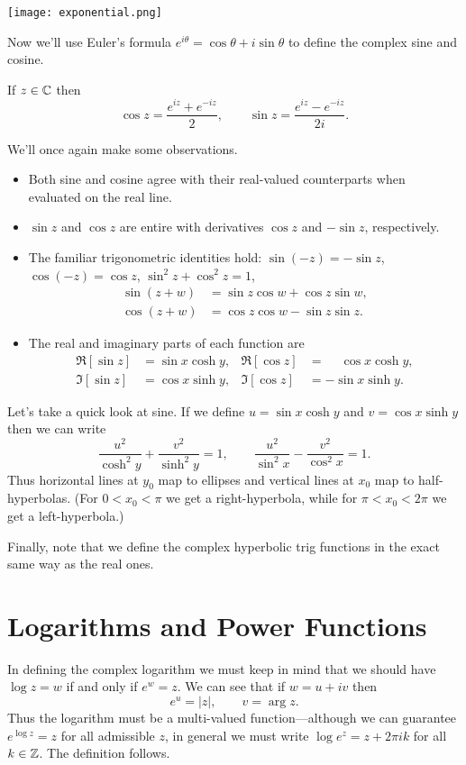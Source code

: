 \documentclass[../m136main.tex]{subfiles}
\begin{document}
\begin{center}
    \texttt{[image: exponential.png]}
\end{center}

Now we'll use Euler's formula $e^{i\theta} = \cos \theta + i \sin \theta$ to define the complex sine and cosine.

\begin{definition}
    If $z \in \mathbb{C}$ then
    \[ \cos z = \frac{e^{iz} + e^{-iz}}{2}, \qquad \sin z = \frac{e^{iz} - e^{-iz}}{2i}. \]
\end{definition}

We'll once again make some observations.
\begin{itemize}[topsep=0pt]
    \item Both sine and cosine agree with their real-valued counterparts when evaluated on the real line.
    \item $\sin z$ and $\cos z$ are entire with derivatives $\cos z$ and $-\sin z$, respectively.
    \item The familiar trigonometric identities hold: $\sin(-z) = -\sin z$, $\cos(-z) = \cos z$, $\sin^2 z + \cos^2 z = 1$,
    \begin{align*}
        \sin(z + w) &= \sin z \cos w + \cos z \sin w, \\
        \cos(z + w) &= \cos z \cos w - \sin z \sin z.
    \end{align*}
    \item The real and imaginary parts of each function are
    \begin{align*}
        \Re [\sin z] &= \sin x \cosh y, & \Re [\cos z] &= \phantom{-}\cos x \cosh y, \\
        \Im [\sin z] &= \cos x \sinh y, & \Im [\cos z] &= -\sin x \sinh y.
    \end{align*}
\end{itemize}
Let's take a quick look at sine.
If we define $u = \sin x \cosh y$ and $v = \cos x \sinh y$ then we can write
\[ \frac{u^2}{\cosh^2 y} + \frac{v^2}{\sinh^2 y} = 1, \qquad \frac{u^2}{\sin^2 x} - \frac{v^2}{\cos^2 x} = 1. \]
Thus horizontal lines at $y_0$ map to ellipses and vertical lines at $x_0$ map to half-hyperbolas.
(For $0 < x_0 < \pi$ we get a right-hyperbola, while for $\pi < x_0 < 2\pi$ we get a left-hyperbola.)

Finally, note that we define the complex hyperbolic trig functions in the exact same way as the real ones.

\section{Logarithms and Power Functions}
In defining the complex logarithm we must keep in mind that we should have $\log z = w$ if and only if $e^{w} = z$.
We can see that if $w = u + iv$ then
\[ e^{u} = |z|, \qquad v = \arg z. \]
Thus the logarithm must be a multi-valued function---although we can guarantee $e^{\log z} = z$ for all admissible $z$, in general we must write $\log e^{z} = z + 2\pi i k$ for all $k \in \mathbb{Z}$.
The definition follows.
\end{document}
